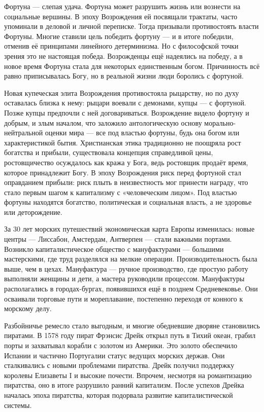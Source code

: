 Фортуна --- слепая удача. Фортуна может разрушить жизнь или вознести на социальные вершины. В эпоху Возрождения ей посвящали трактаты, часто упоминали в деловой и личной переписке. Тогда призывали противостоять власти Фортуны. Многие ставили цель победить фортуну --- и в итоге победили, отменив её принципами линейного детерминизма. Но с философской точки зрения это не настоящая победа. Возрожденцы ещё надеялись на победу, а в новое время Фортуна стала для некоторых единственным богом. Причинность всё равно приписывалась Богу, но в реальной жизни люди боролись с фортуной.

Новая купеческая элита Возрождения противостояла рыцарству, но по духу оставалась близка к нему: рыцари воевали с демонами, купцы --- с фортуной. Позже купцы предпочли с ней договариваться. Возрождение видело фортуну и добрым, и злым началом, что заложило антологическую основу морально-нейтральной оценки мира --- все под властью фортуны, будь она богом или характеристикой бытия.
Христианская этика традиционно не поощряла рост богатства и прибыли, существовала концепция справедливой цены, ростовщичество осуждалось как кража у Бога, ведь ростовщик продаёт время, которое принадлежит Богу. В эпоху Возрождения риск перед фортуной стал оправданием прибыли: риск плыть в неизвестность мог принести награду, что стало первым шагом к капитализму с «человеческим лицом». Под властью фортуны находятся богатство, политическая и социальная власть, а не здоровье или деторождение.

За 30 лет морских путешествий экономическая карта Европы изменилась: новые центры --- Лиссабон, Амстердам, Антверпен --- стали важными портами. Возникло капиталистическое общество с мануфактурами --- большими мастерскими, где труд разделялся на мелкие операции. Производительность была выше, чем в цехах. Мануфактура --- ручное производство, где простую работу выполняли женщины и дети, а мастера руководили процессом. Мануфактуры располагались в городах-бургах, появившихся ещё в позднем Средневековье. Они осваивали торговые пути и мореплавание, постепенно переходя от конного к морскому делу.

Разбойничье ремесло стало выгодным, и многие обедневшие дворяне становились пиратами. В 1578 году пират Фрэнсис Дрейк открыл путь в Тихий океан, грабил порты и захватывал корабли с золотом из Америки. Это золото обеспечило Испании и частично Португалии статус ведущих морских держав. Они сталкивались с новыми проблемами пиратства. Дрейк получил поддержку королевы Елизаветы I и высокие почести. Впрочем, несмотря на романтизацию пиратства, оно в итоге разрушило ранний капитализм. После успехов Дрейка началась эпоха пиратства, которая подорвала развитие капиталистической системы.

